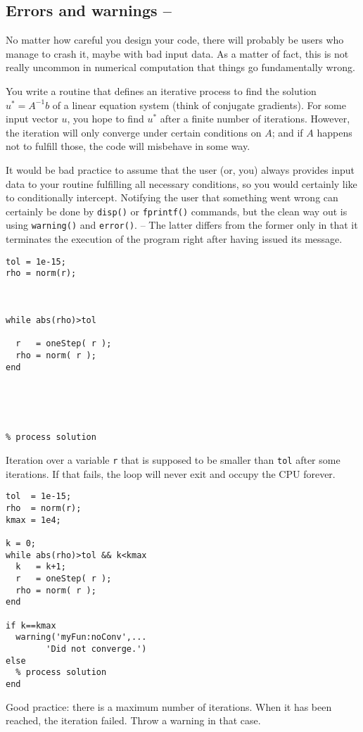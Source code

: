 \subsection{Errors and warnings -- \cleansymbol\cleansymbol}

No matter how careful you design your code, there will probably be users who manage to crash it, maybe with bad input data. As a matter of fact, this is not really uncommon in numerical computation that things go fundamentally wrong.

\begin{example}
You write a routine that defines an iterative process to find the solution
$u^* = A^{-1}b$ of a linear equation system (think of conjugate gradients).
For some input vector $u$, you hope to find $u^*$ after a finite number of
iterations. However, the iteration will only converge under certain conditions
on $A$; and if $A$ happens not to fulfill those, the code will misbehave in
some way.
\end{example}

It would be bad practice to assume that the user (or, you) always provides
input data to your routine fulfilling all necessary conditions, so you would
certainly like to conditionally intercept. Notifying the user that something
went wrong can certainly be done by \lstinline!disp()! or
\lstinline!fprintf()! commands, but the clean way out is using
\lstinline!warning()! and \lstinline!error()!. -- The latter differs from the
former only in that it terminates the execution of the program right after
having issued its message.

\hfill
\begin{minipage}[t]{.45\textwidth}
\begin{lstlisting}[framerule=2pt,rulecolor=\color{badred}]
tol = 1e-15;
rho = norm(r);



while abs(rho)>tol

  r   = oneStep( r );
  rho = norm( r );
end





% process solution

\end{lstlisting}
Iteration over a variable \lstinline!r! that is supposed to be smaller than \lstinline!tol! after some iterations. If that fails, the loop will never exit and occupy the CPU forever.
\end{minipage}
\hfill
\begin{minipage}[t]{.45\textwidth}
\begin{lstlisting}[framerule=2pt,rulecolor=\color{goodgreen}]
tol  = 1e-15;
rho  = norm(r);
kmax = 1e4;

k = 0;
while abs(rho)>tol && k<kmax
  k   = k+1;
  r   = oneStep( r );
  rho = norm( r );
end

if k==kmax
  warning('myFun:noConv',...
        'Did not converge.')
else
  % process solution
end
\end{lstlisting}
Good practice: there is a maximum number of iterations. When it has been reached, the iteration failed. Throw a warning in that case.
\end{minipage}
\hfill

